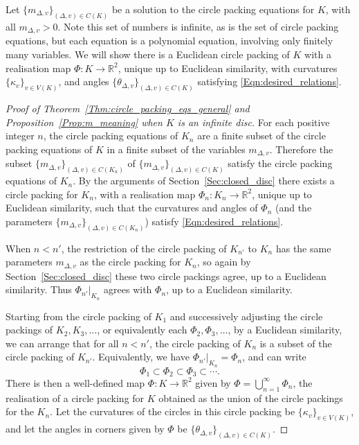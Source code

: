 \documentclass[12pt]{amsart}
\numberwithin{equation}{section}
\theoremstyle{named}
\newcommand{\refsec}[1]{Section~\ref{Sec:#1}}
\newcommand{\refeqn}[1]{\eqref{Eqn:#1}}
\newcommand{\refprop}[1]{Proposition~\ref{Prop:#1}}
\newcommand{\refthm}[1]{Theorem~\ref{Thm:#1}}
\newcommand{\R}{\mathbb{R}}
\newcommand{\To}{\longrightarrow}
\begin{document}
Let $\{m_{\Delta,v}\}_{(\Delta,v) \in C(K)}$ be a solution to the circle packing equations for $K$, with all $m_{\Delta,v} > 0$. Note this set of numbers is infinite, as is the set of circle packing equations, but each equation is a polynomial equation, involving only finitely many variables. We will show there is a Euclidean circle packing of $K$ with a realisation map $\Phi \colon K \To \R^2$, unique up to Euclidean similarity, with curvatures $\{\kappa_v\}_{v \in V(K)}$, and angles $\{\theta_{\Delta,v}\}_{(\Delta,v) \in C(K)}$ satisfying \refeqn{desired_relations}.

\begin{proof}[Proof of \refthm{circle_packing_eqs_general} and \refprop{m_meaning} when $K$ is an infinite disc]
For each positive integer $n$, the circle packing equations of $K_n$ are a finite subset of the circle packing equations of $K$ in a finite subset of the variables $m_{\Delta,v}$. Therefore the subset $\{m_{\Delta,v}\}_{(\Delta,v) \in C(K_n)}$ of $\{m_{\Delta,v}\}_{(\Delta,v) \in C(K)}$ satisfy the circle packing equations of $K_n$. By the arguments of \refsec{closed_disc} there exists a circle packing for $K_n$, with a realisation map $\Phi_n \colon K_n \To \R^2$, unique up to Euclidean similarity, such that the curvatures and angles of $\Phi_n$ (and the parameters $\{m_{\Delta,v}\}_{(\Delta,v) \in C(K_n)}$) satisfy \refeqn{desired_relations}.

When $n < n'$, the restriction of the circle packing of $K_{n'}$ to $K_n$ has the same parameters $m_{\Delta,v}$ as the circle packing for $K_n$, so again by \refsec{closed_disc} these two circle packings agree, up to a Euclidean similarity. Thus $\Phi_{n'}|_{K_n}$ agrees with $\Phi_n$, up to a Euclidean similarity.

Starting from the circle packing of $K_1$ and successively adjusting the circle packings of $K_2, K_3, \ldots$, or equivalently each $\Phi_2, \Phi_3, \ldots$, by a Euclidean similarity, we can arrange that for all $n < n'$, the circle packing of $K_{n}$ is a subset of the circle packing of $K_{n'}$. Equivalently, we have $\Phi_{n'} |_{K_n} = \Phi_n$, and can write 
\[
\Phi_1 \subset \Phi_2 \subset \Phi_3 \subset \cdots.
\]
There is then a well-defined map $\Phi \colon K \To \R^2$ given by $\Phi = \bigcup_{n=1}^\infty \Phi_n$, the realisation of a circle packing for $K$ obtained as the union of the circle packings for the $K_n$. Let the curvatures of the circles in this circle packing be $\{\kappa_v\}_{v \in V(K)}$, and let the angles in corners given by $\Phi$ be $\{\theta_{\Delta,v}\}_{(\Delta,v) \in C(K)}$.


\end{proof}
\end{document}
